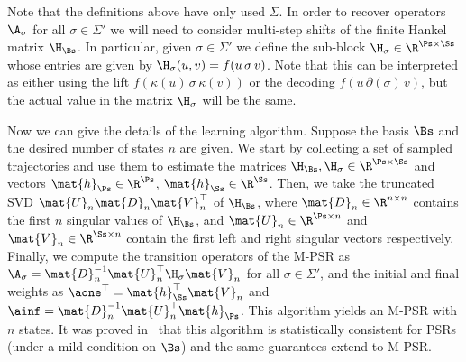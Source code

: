 Note that the definitions above have only used $\Sigma$. In order to recover operators $\A_\sigma$ for all $\sigma \in \Sigma'$ we will need to consider multi-step shifts of the finite Hankel matrix $\H_{\Bs}$. In particular, given $\sigma \in \Sigma'$ we define the sub-block $\H_\sigma \in \R^{\Ps \times \Ss}$ whose entries are given by $\H_\sigma(u,v) = f(u \, \sigma \, v)$. Note that this can be interpreted as either using the lift $f(\kappa(u) \, \sigma \, \kappa(v))$ or the decoding $f(u \, \partial(\sigma) \, v)$, but the actual value in the matrix $\H_\sigma$ will be the same.

Now we can give the details of the learning algorithm. Suppose the basis $\Bs$ and the desired number of states $n$ are given. We start by collecting a set of sampled trajectories and use them to estimate the matrices $\H_{\Bs}, \H_\sigma \in \R^{\Ps \times \Ss}$ and vectors $\mat{h}_{\Ps} \in \R^{\Ps}$, $\mat{h}_{\Ss} \in \R^{\Ss}$. Then, we take the truncated SVD $\mat{U}_n \mat{D}_n \mat{V}_n^\top$ of $\H_{\Bs}$, where $\mat{D}_n \in \R^{n \times n}$ contains the first $n$ singular values of $\H_{\Bs}$, and $\mat{U}_n \in \R^{\Ps \times n}$ and $\mat{V}_n \in \R^{\Ss \times n}$ contain the first left and right singular vectors respectively. Finally, we compute the transition operators of the M-PSR as $\A_\sigma = \mat{D}_n^{-1} \mat{U}_n^\top \H_\sigma \mat{V}_n$ for all $\sigma \in \Sigma'$, and the initial and final weights as $\aone^\top = \mat{h}_{\Ss}^\top \mat{V}_n$ and $\ainf = \mat{D}_n^{-1} \mat{U}_n^\top \mat{h}_{\Ps}$.
%
This algorithm yields an M-PSR with $n$ states. It was proved in~\cite{bootspsr} that this algorithm is statistically consistent for PSRs (under a mild condition on $\Bs$) and the same guarantees extend to M-PSR.

